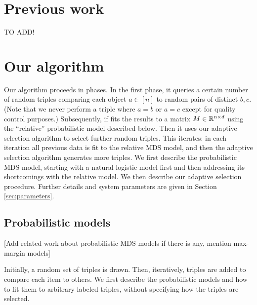 \documentclass{article}
\begin{document}
\section{Previous work}

TO ADD!

\section{Our algorithm}

Our algorithm proceeds in phases.  In the first phase, it queries a certain number of random triples comparing each object $a \in [n]$ to random pairs of distinct $b,c$.  (Note that we never perform a triple where $a=b$ or $a=c$ except for quality control purposes.) Subsequently, if fits the results to a matrix $M \in \mathbb{R}^{n \times d}$ using the ``relative'' probabilistic model described below.  Then it uses our adaptive selection algorithm to select further random triples.  This iterates: in each iteration all previous data is fit to the relative MDS model, and then the adaptive selection algorithm generates more triples.  We first describe the probabilistic MDS model, starting with a natural logistic model first and then addressing its shortcomings with the relative model.  We then describe our adaptive selection procedure.  Further details and system parameters are given in Section \ref{sec:parameters}.

\subsection{Probabilistic models}

[Add related work about probabilistic MDS models if there is any, mention max-margin models]

Initially, a random set of triples is drawn.  Then, iteratively, triples are added to compare each item to others.  We first describe the probabilistic models and how to fit them to arbitrary labeled triples, without specifying how the triples are selected.
\end{document}
